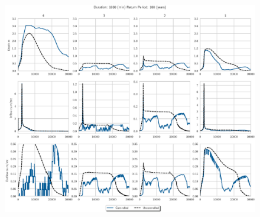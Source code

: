 \begin{figure}
    \centering
    \includegraphics[width=\linewidth]{./RL-SI-figures/77storms/1080100.eps}
\end{figure}


